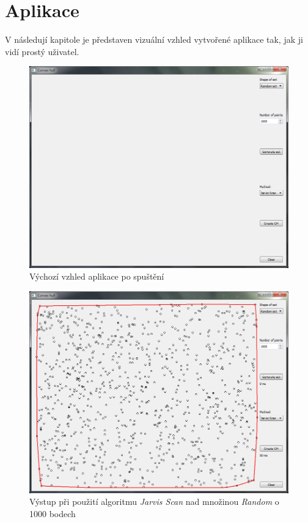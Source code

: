 \documentclass[a4paper, 12pt]{article}
\begin{document}
\clearpage
\section{Aplikace}
V následují kapitole je představen vizuální vzhled vytvořené aplikace tak, jak ji vidí prostý uživatel.

\begin{figure}[h!]
	\centering
	\includegraphics[width=11.5cm]{./pictures/app_default.png}
	\caption{Výchozí vzhled aplikace po spuštění}
\end{figure}

\begin{figure}[h!]
	\centering
	\includegraphics[width=11.5cm]{./pictures/app_random_jarvis.png}
	\caption{Výstup při použití algoritmu \textit{Jarvis Scan} nad množinou \textit{Random} o 1000 bodech}
\end{figure}
\end{document}
